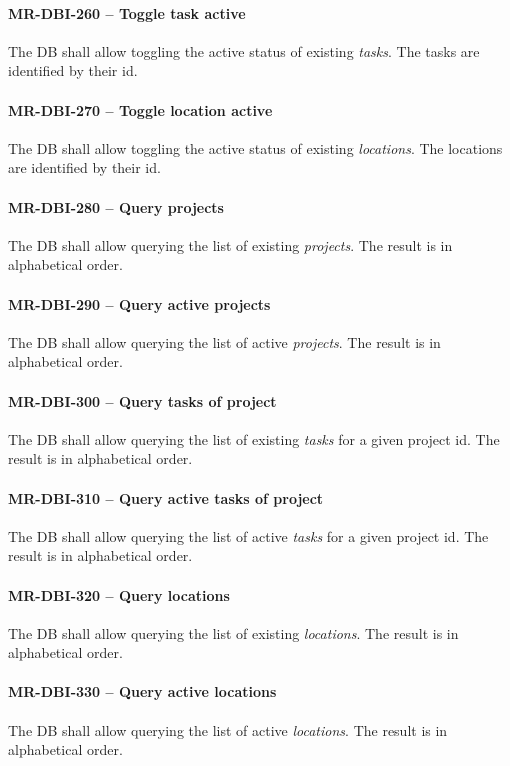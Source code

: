 \paragraph{MR-DBI-260 -- Toggle task active}
The \gls{DB} shall allow toggling the active status of existing \emph{tasks}.
The tasks are identified by their id.

\paragraph{MR-DBI-270 -- Toggle location active}
The \gls{DB} shall allow toggling the active status of existing \emph{locations}.
The locations are identified by their id.

\paragraph{MR-DBI-280 -- Query projects}
The \gls{DB} shall allow querying the list of existing \emph{projects}.
The result is in alphabetical order.

\paragraph{MR-DBI-290 -- Query active projects}
The \gls{DB} shall allow querying the list of active \emph{projects}.
The result is in alphabetical order.

\paragraph{MR-DBI-300 -- Query tasks of project}
The \gls{DB} shall allow querying the list of existing \emph{tasks}
for a given project id.
The result is in alphabetical order.

\paragraph{MR-DBI-310 -- Query active tasks of project}
The \gls{DB} shall allow querying the list of active \emph{tasks}
for a given project id.
The result is in alphabetical order.

\paragraph{MR-DBI-320 -- Query locations}
The \gls{DB} shall allow querying the list of existing \emph{locations}.
The result is in alphabetical order.

\paragraph{MR-DBI-330 -- Query active locations}
The \gls{DB} shall allow querying the list of active \emph{locations}.
The result is in alphabetical order.

